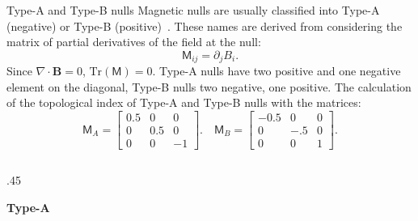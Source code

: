 \documentclass[final]{beamer}
\newlength{\onecolwid}
\newlength{\twocolwid}
\begin{document}
\begin{frame}[t]
\begin{columns}[t]
\begin{column}{\twocolwid}
\begin{columns}[t,totalwidth=\twocolwid]
\begin{column}{\onecolwid}

\begin{block}{Type-A and Type-B nulls}
    Magnetic nulls are usually classified into Type-A (negative) or Type-B (positive)~\cite{lau1990three, parnell1996structure, greene1988geometrical}.
    These names are derived from considering the matrix of partial derivatives of the
    field at the null:
    \begin{equation}\label{eq:matrix}
        \mathsf{M}_{ij}= \partial_j B_i.
    \end{equation}
    Since $\nabla\cdot\mathbf{B}=0$, $\mathrm{Tr}(\mathsf{M})=0$.
    Type-A nulls have two positive and one negative element on the diagonal, Type-B nulls
    two negative, one positive.
    The calculation of the topological index of Type-A and Type-B nulls with the matrices:
    \begin{equation}
        \mathsf{M}_A = \begin{bmatrix} 0.5 & 0&0 \\ 0 & 0.5 & 0 \\
        0&0& -1  \end{bmatrix}.
        \quad
        \mathsf{M}_B = \begin{bmatrix} -0.5 & 0&0 \\ 0 & -.5 & 0 \\
        0&0& 1  \end{bmatrix}.
    \end{equation}
\begin{columns}[t,totalwidth=\onecolwid] %
    \begin{column}{.45\onecolwid}
        \begin{centering}
        \textbf{Type-A}
        \begin{figure}

\end{figure}
\end{centering}
\end{column}
\end{columns}
\end{block}
\end{column}
\end{columns}
\end{column}
\end{columns}
\end{frame}
\end{document}
